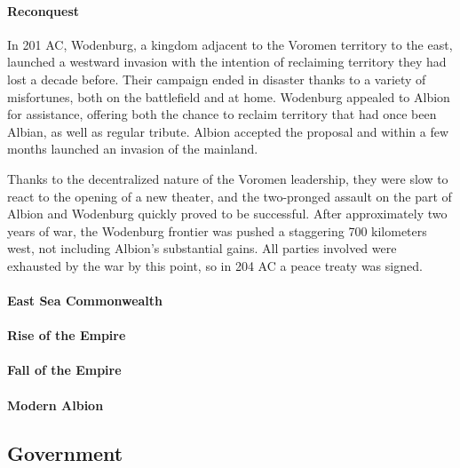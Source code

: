 	\paragraph{Reconquest}

	In 201 AC, Wodenburg, a kingdom adjacent to the Voromen territory to the east, launched a westward invasion with the intention of reclaiming territory they had lost a decade before.  Their campaign ended in disaster thanks to a variety of misfortunes, both on the battlefield and at home.  Wodenburg appealed to Albion for assistance, offering both the chance to reclaim territory that had once been Albian, as well as regular tribute.  Albion accepted the proposal and within a few months launched an invasion of the mainland.  

Thanks to the decentralized nature of the Voromen leadership, they were slow to react to the opening of a new theater, and the two-pronged assault on the part of Albion and Wodenburg quickly proved to be successful.  After approximately two years of war, the Wodenburg frontier was pushed a staggering 700 kilometers west, not including Albion's substantial gains.  All parties involved were exhausted by the war by this point, so in 204 AC a peace treaty was signed.

	\paragraph{East Sea Commonwealth} 

	\paragraph{Rise of the Empire}

	\paragraph{Fall of the Empire}

	\paragraph{Modern Albion} %


\subsection{Government} 
	

